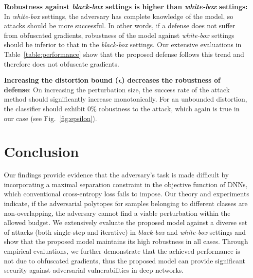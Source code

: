 \documentclass[10pt,twocolumn,letterpaper]{article}
\begin{document}
\noindent
\textbf{Robustness against \textit{black-box} settings is higher than \textit{white-box} settings:} In \textit{white-box} settings, the adversary has complete knowledge of the model, so attacks should be more successful. In other words, if a defense does not suffer from obfuscated gradients, robustness of the model against \textit{white-box} settings should be inferior to that in the \textit{black-box} settings. Our extensive evaluations in Table~\ref{table:performance} show that the proposed defense follows this trend and therefore does not obfuscate gradients. 

\noindent
\textbf{Increasing the distortion bound ($\bm{\epsilon}$) decreases the robustness of defense}: On increasing the perturbation size, the success rate of the attack method should significantly increase monotonically. For an unbounded distortion, the classifier should exhibit 0\% robustness to the attack, which again is true in our case (see Fig.~\ref{fig:epsilon}).













\vspace{-0.35em}
\section{Conclusion}
\vspace{-0.5em}
Our findings provide evidence that the adversary's task is made difficult by incorporating a maximal separation constraint in the objective function of DNNs, which conventional cross-entropy loss fails to impose. Our theory and experiments indicate, if the adversarial polytopes for samples belonging to different classes are non-overlapping, the adversary cannot find a viable perturbation within the allowed budget. We extensively evaluate the proposed model against a diverse set of attacks (both single-step and iterative) in \textit{black-box} and \textit{white-box} settings and show that the proposed model maintains its high robustness in all cases. Through empirical evaluations, we further demonstrate that the achieved performance is not due to obfuscated gradients, thus the proposed model can provide significant security against adversarial vulnerabilities in deep networks. 

































{\small


}
\end{document}
